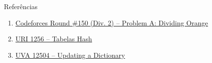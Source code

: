 \begin{frame}[fragile]{Referências}

    \begin{enumerate}
        \item \href{https://codeforces.com/problemset/problem/244/A}{Codeforces Round \#150 (Div. 2) -- Problem A: Dividing Orange}

        \item \href{https://www.urionlinejudge.com.br/judge/pt/problems/view/1256}{URI 1256 -- Tabelas Hash}

        \item \href{https://uva.onlinejudge.org/index.php?option=com_onlinejudge&Itemid=8&category=24&page=show_problem&problem=3948}{UVA 12504 -- Updating a Dictionary}

    \end{enumerate}


\end{frame}
